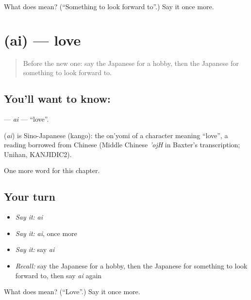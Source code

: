 \begin{tcolorbox}[breakable,colback=teal!4,colframe=teal!35!black,title={Before you move on}]
What does  mean? (\textquotedblleft{}Something to look forward to\textquotedblright{}.) Say it once more.
\end{tcolorbox}
\section[\texorpdfstring{\ja{あい} (ai)}{あい (ai)}]{ (ai) — love}

\label{lesson:JA-C94-ai}



\begin{quote}
Before the new one: say the Japanese for a hobby, then the Japanese for something to look forward to.
\end{quote}

\subsection*{You'll want to know: }
\textbf{} — \emph{ai} — \textquotedblleft{}love\textquotedblright{}.

\begin{cousinweb}
\textbf{} (\emph{ai}) is Sino-Japanese (kango): the on'yomi of a character meaning \textquotedblleft{}love\textquotedblright{}, a reading borrowed from Chinese (Middle Chinese \emph{'ojH} in Baxter's transcription; Unihan, KANJIDIC2).
\end{cousinweb}

\begin{grammarlens}[title={What you've built}]
One more word for this chapter.
\end{grammarlens}

\subsection*{Your turn}
\begin{itemize}
\raggedright
  \item \emph{Say it:} \emph{ai}
  \item \emph{Say it:} \emph{ai}, once more
  \item \emph{Say it:} say \emph{ai}
  \item \emph{Recall:} say the Japanese for a hobby, then the Japanese for something to look forward to, then say \emph{ai} again
\end{itemize}

\begin{tcolorbox}[breakable,colback=teal!4,colframe=teal!35!black,title={Before you move on}]
What does  mean? (\textquotedblleft{}Love\textquotedblright{}.) Say it once more.
\end{tcolorbox}
